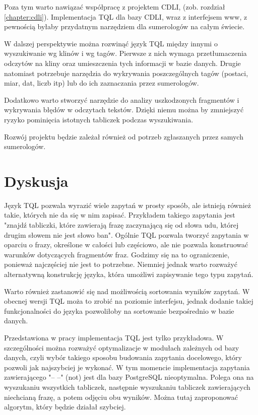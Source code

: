 Poza tym warto nawiązać współpracę z projektem CDLI, (zob. rozdział \ref{chapter:cdli}).
Implementacja TQL dla bazy CDLI, wraz z interfejsem www, z pewnością byłaby przydatnym narzędziem dla sumerologów na całym świecie.

W dalszej perspektywie można rozwinąć język TQL między innymi o wyszukiwanie wg klinów i wg tagów. 
Pierwsze z nich wymaga przetłumaczenia odczytów na kliny oraz umieszczenia tych informacji w bazie danych.
Drugie natomiast potrzebuje narzędzia do wykrywania poszczególnych tagów
(postaci, miar, dat, liczb itp) lub do ich zaznaczania przez sumerologów.

Dodatkowo warto stworzyć narzędzie do analizy uszkodzonych fragmentów i wykrywania błędów w odczytach tekstów. 
Dzięki niemu można by zmniejszyć ryzyko pominięcia istotnych tabliczek podczas wyszukiwania. 

Rozwój projektu będzie zależał również od potrzeb zgłaszanych przez samych sumerologów.


\section*{Dyskusja}

Język TQL pozwala wyrazić wiele zapytań w prosty sposób, ale istnieją również takie, których nie da się w nim zapisać.
Przykładem takiego zapytania jest "znajdź tabliczki, które zawierają frazę zaczynającą się od słowa udu, której drugim słowem nie jest słowo ban".
Ogólnie TQL pozwala tworzyć zapytania w oparciu o frazy, określone w całości lub częściowo, ale nie pozwala konstruować warunków
dotyczących fragmentów fraz. Godzimy się na to ograniczenie, ponieważ najczęściej nie jest to potrzebne. Niemniej jednak
warto rozważyć alternatywną konstrukcję języka, która umożliwi zapisywanie tego typu zapytań.

Warto również zastanowić się nad możliwością sortowania wyników zapytań. W obecnej wersji TQL moża to zrobić na poziomie interfejsu, jednak
dodanie takiej funkcjonalności do języka pozwoliłoby na sortowanie bezpośrednio w bazie danych.

Przedstawiona w pracy implementacja TQL jest tylko przykładowa. W szczególności można rozważyć optymalizacje w modułach zależnych od bazy
danych, czyli wybór takiego sposobu budowania zapytania docelowego, który pozwoli jak najszybciej je wykonać. 
W tym momencie implementacja zapytania zawierającego "-- --" (not) jest dla bazy PostgreSQL nieoptymalna.
Polega ona na wyszukaniu wszystkich tabliczek, następnie wyszukaniu tabliczek zawierających niechcianą frazę, a potem odjęciu obu wyników.
Można tutaj zaproponować algorytm, który będzie działał szybciej.

